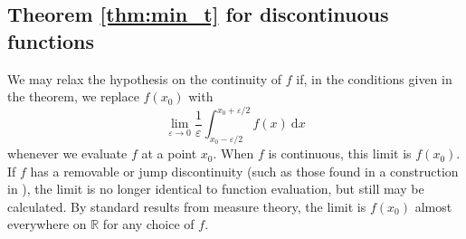 \documentclass[11pt,reqno]{amsart}
\numberwithin{equation}{section}
\theoremstyle{plain}
\begin{document}
\subsection{Theorem \ref{thm:min_t} for discontinuous functions}\label{subsection:discontinuous}

We may relax the hypothesis on the continuity of $f$ if, in the conditions given in the theorem, we replace $f(x_0)$ with
\begin{equation*}
    \lim_{\varepsilon \to 0} \frac{1}{\varepsilon}\int_{x_0-\varepsilon/2}^{x_0+\varepsilon/2}f(x)\ \mathrm{d}x
\end{equation*}
whenever we evaluate $f$ at a point $x_0$. When $f$ is continuous, this limit is $f(x_0)$. If $f$ has a removable or jump discontinuity (such as those found in a construction in \cite{BS}), the limit is no longer identical to function evaluation, but still may be calculated. By standard results from measure theory, the limit is $f(x_0)$ almost everywhere on $\mathbb{R}$ for any choice of $f$.

\end{document}
